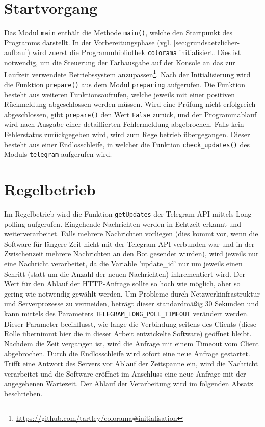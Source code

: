 \section{Startvorgang}
\label{sec:startvorgang}

Das Modul \lstinline{main} enthält die Methode \lstinline{main()}, welche den Startpunkt des Programms darstellt. In der Vorbereitungsphase (vgl. \autoref{sec:grundsaetzlicher-aufbau}) wird zuerst die Programmbibliothek \lstinline{colorama} initialisiert. Dies ist notwendig, um die Steuerung der Farbausgabe auf der Konsole an das zur Laufzeit verwendete Betriebssystem anzupassen\footnote{\url{https://github.com/tartley/colorama\#initialisation}}. Nach der Initialisierung wird die Funktion \lstinline{prepare()} aus dem Modul \lstinline{preparing} aufgerufen. Die Funktion besteht aus weiteren Funktionsaufrufen, welche jeweils mit einer positiven Rückmeldung abgeschlossen werden müssen. Wird eine Prüfung nicht erfolgreich abgeschlossen, gibt \lstinline{prepare()} den Wert \lstinline{False} zurück, und der Programmablauf wird nach Ausgabe einer detaillierten Fehlermeldung abgebrochen. Falls kein Fehlerstatus zurückgegeben wird, wird zum Regelbetrieb übergegangen. Dieser besteht aus einer Endlosschleife, in welcher die Funktion \lstinline{check_updates()} des Moduls \lstinline{telegram} aufgerufen wird.

\section{Regelbetrieb}

Im Regelbetrieb wird die Funktion \lstinline{getUpdates} der Telegram-API mittels Long-polling aufgerufen. Eingehende Nachrichten werden in Echtzeit erkannt und weiterverarbeitet. Falls mehrere Nachrichten vorliegen (dies kommt vor, wenn die Software für längere Zeit nicht mit der Telegram-API verbunden war und in der Zwischenzeit mehrere Nachrichten an den Bot gesendet wurden), wird jeweils nur eine Nachricht verarbeitet, da die Variable 'update\_id' nur um jeweils einen Schritt (statt um die Anzahl der neuen Nachrichten) inkrementiert wird. Der Wert für den Ablauf der HTTP-Anfrage sollte so hoch wie möglich, aber so gering wie notwendig gewählt werden. Um Probleme durch Netzwerkinfrastruktur und Serverprozesse zu vermeiden, beträgt dieser standardmäßig 30 Sekunden \cite[Abs. 5.5. Timeouts]{rfc6202} und kann mittels des Parameters \lstinline{TELEGRAM_LONG_POLL_TIMEOUT} verändert werden. Dieser Parameter beeinflusst, wie lange die Verbindung seitens des Clients (diese Rolle übernimmt hier die in dieser Arbeit entwickelte Software) geöffnet bleibt. Nachdem die Zeit vergangen ist, wird die Anfrage mit einem Timeout vom Client abgebrochen. Durch die Endlosschleife wird sofort eine neue Anfrage gestartet. Trifft eine Antwort des Servers vor Ablauf der Zeitspanne ein, wird die Nachricht verarbeitet und die Software eröffnet im Anschluss eine neue Anfrage mit der angegebenen Wartezeit. Der Ablauf der Verarbeitung wird im folgenden Absatz beschrieben.

